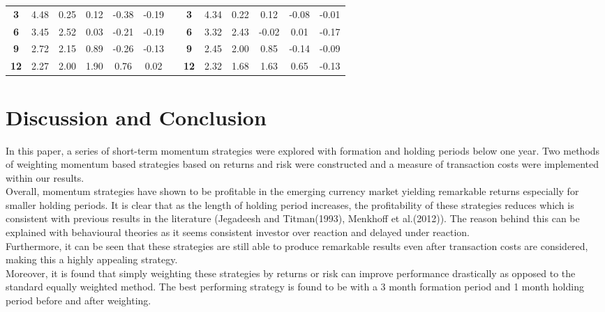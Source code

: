 \documentclass{article}
\begin{document}
\begin{table}[htb!]
\begin{tabular}{ccccccccccccc}
    \textbf{3} & 4.48  & 0.25  & 0.12  & -0.38 & -0.19 &       & \textbf{3} & 4.34  & 0.22  & 0.12  & -0.08 & -0.01 \\
    \textbf{6} & 3.45  & 2.52  & 0.03  & -0.21 & -0.19 &       & \textbf{6} & 3.32  & 2.43  & -0.02 & 0.01  & -0.17 \\
    \textbf{9} & 2.72  & 2.15  & 0.89  & -0.26 & -0.13 &       & \textbf{9} & 2.45  & 2.00  & 0.85  & -0.14 & -0.09 \\
    \textbf{12} & 2.27  & 2.00  & 1.90  & 0.76  & 0.02  &       & \textbf{12} & 2.32  & 1.68  & 1.63  & 0.65  & -0.13 \\
    \bottomrule
    \end{tabular}%
  \label{SPLIT}%
\end{table}%

\newpage
\section{Discussion and Conclusion}

In this paper, a series of short-term momentum strategies were explored with formation and holding periods below one year. Two methods of weighting momentum based strategies based on returns and risk were constructed and a measure of transaction costs were implemented within our results. \\

Overall, momentum strategies have shown to be profitable in the emerging currency market yielding remarkable returns especially for smaller holding periods. It is clear that as the length of holding period increases, the profitability of these strategies reduces which is consistent with previous results in the literature (Jegadeesh and Titman(1993), Menkhoff et al.(2012)). The reason behind this can be explained with behavioural theories as it seems consistent investor over reaction and delayed under reaction.\\

Furthermore, it can be seen that these strategies are still able to produce remarkable results even after transaction costs are considered, making this a highly appealing strategy. \\

Moreover, it is found that simply weighting these strategies by returns or risk can improve performance drastically as opposed to the standard equally weighted method. The best performing strategy is found to be with a 3 month formation period and 1 month holding period before and after weighting. \\
\end{document}
